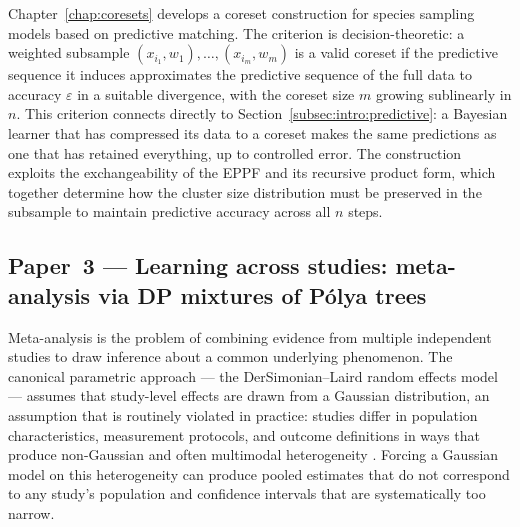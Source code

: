 Chapter~\ref{chap:coresets} develops a coreset construction for species
sampling models based on predictive matching.  The criterion is
decision-theoretic: a weighted subsample $(x_{i_1}, w_1), \ldots,
(x_{i_m}, w_m)$ is a valid coreset if the predictive sequence it induces
approximates the predictive sequence of the full data to accuracy
$\varepsilon$ in a suitable divergence, with the coreset size $m$ growing
sublinearly in $n$.  This criterion connects directly to
Section~\ref{subsec:intro:predictive}: a Bayesian learner that has
compressed its data to a coreset makes the same predictions as one that has
retained everything, up to controlled error.  The construction exploits the
exchangeability of the EPPF and its recursive product form, which together
determine how the cluster size distribution must be preserved in the
subsample to maintain predictive accuracy across all $n$ steps.

\subsection{Paper~3 --- Learning across studies: meta-analysis via DP mixtures of P\'{o}lya trees}
\label{subsec:intro:paper3}

Meta-analysis is the problem of combining evidence from multiple
independent studies to draw inference about a common underlying
phenomenon.  The canonical parametric approach --- the
DerSimonian--Laird random effects model \citep{DerSimonianLaird1986} ---
assumes that study-level effects are drawn from a Gaussian distribution,
an assumption that is routinely violated in practice: studies differ in
population characteristics, measurement protocols, and outcome definitions
in ways that produce non-Gaussian and often multimodal heterogeneity
\citep{HigginsThompson2002, TurnerEtAl2012}.  Forcing a Gaussian model on
this heterogeneity can produce pooled estimates that do not correspond to
any study's population and confidence intervals that are systematically too
narrow.

